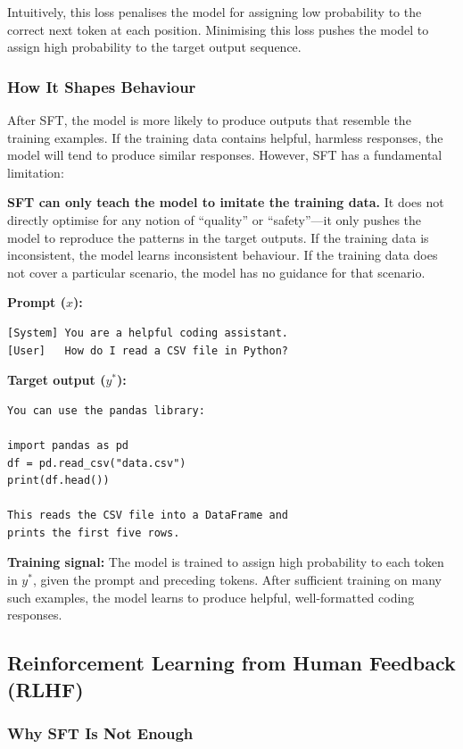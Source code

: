 \documentclass[11pt, a4paper]{article}
\begin{document}
Intuitively, this loss penalises the model for assigning low probability to the correct next token at each position. Minimising this loss pushes the model to assign high probability to the target output sequence.

\subsubsection{How It Shapes Behaviour}

After SFT, the model is more likely to produce outputs that resemble the training examples. If the training data contains helpful, harmless responses, the model will tend to produce similar responses. However, SFT has a fundamental limitation:

\textbf{SFT can only teach the model to imitate the training data.} It does not directly optimise for any notion of ``quality'' or ``safety''---it only pushes the model to reproduce the patterns in the target outputs. If the training data is inconsistent, the model learns inconsistent behaviour. If the training data does not cover a particular scenario, the model has no guidance for that scenario.

\begin{example}[title={SFT Training Example}]
\textbf{Prompt ($x$):}
\begin{lstlisting}
[System] You are a helpful coding assistant.
[User]   How do I read a CSV file in Python?
\end{lstlisting}
\textbf{Target output ($y^*$):}
\begin{lstlisting}
You can use the pandas library:

import pandas as pd
df = pd.read_csv("data.csv")
print(df.head())

This reads the CSV file into a DataFrame and
prints the first five rows.
\end{lstlisting}
\textbf{Training signal:} The model is trained to assign high probability to each token in $y^*$, given the prompt and preceding tokens. After sufficient training on many such examples, the model learns to produce helpful, well-formatted coding responses.
\end{example}

\subsection{Reinforcement Learning from Human Feedback (RLHF)}
\label{app:rlhf}

\subsubsection{Why SFT Is Not Enough}
\end{document}
